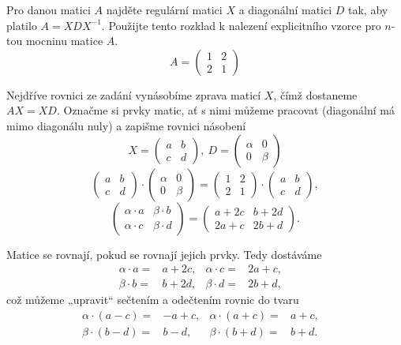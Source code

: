 \documentclass[12pt]{article}					%
\begin{document}
\pagebreak

    \begin{priklad}[5.bonus]
        Pro danou matici $A$ najděte regulární matici $X$ a diagonální matici $D$ tak, aby platilo $A = XDX^{−1}$. Použijte tento rozklad k nalezení explicitního vzorce pro $n$-tou mocninu matice $A$.
        $$ A = \begin{pmatrix} 1 & 2 \\ 2 & 1 \end{pmatrix} $$ 

        \begin{reseni}
            Nejdříve rovnici ze zadání vynásobíme zprava maticí $X$, čímž dostaneme $AX = XD$. Označme si prvky matic, ať s nimi můžeme pracovat (diagonální má mimo diagonálu nuly) a zapišme rovnici násobení
            $$ X = \begin{pmatrix} a & b \\ c & d  \end{pmatrix},\ D = \begin{pmatrix} \alpha & 0 \\ 0 & \beta \end{pmatrix} $$
            $$ \begin{pmatrix} a & b \\ c & d  \end{pmatrix} · \begin{pmatrix} \alpha & 0 \\ 0 & \beta \end{pmatrix} = \begin{pmatrix} 1 & 2 \\ 2 & 1 \end{pmatrix} · \begin{pmatrix} a & b \\ c & d  \end{pmatrix}, $$
            $$ \begin{pmatrix} \alpha · a & \beta · b \\ \alpha · c & \beta · d  \end{pmatrix} = \begin{pmatrix} a + 2c & b + 2d \\ 2a + c & 2b + d  \end{pmatrix}. $$

            Matice se rovnají, pokud se rovnají jejich prvky. Tedy dostáváme
            \begin{align*}
                \alpha·a =& a + 2c,&
                \alpha·c =& 2a + c,&\\
                \beta·b =& b + 2d,&
                \beta·d =& 2b + d,&
            \end{align*}
            což můžeme „upravit“ sečtením a odečtením rovnic do tvaru
            \begin{align*}
                \alpha·(a-c) =& -a + c,&
                \alpha·(a+c) =& a + c,&\\
                \beta·(b-d) =& b - d,&
                \beta·(b+d) =& b + d.&
            \end{align*}
            

\end{reseni}
\end{priklad}
\end{document}
